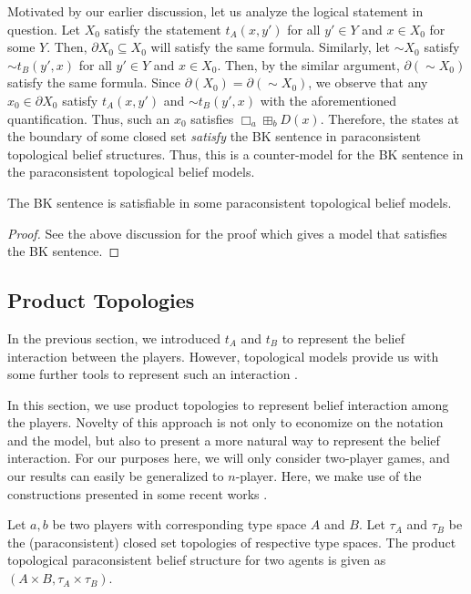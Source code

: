 \documentclass{article}
\begin{document}
Motivated by our earlier discussion, let us analyze the logical statement in question. Let $X_0$ satisfy the statement $t_A(x, y')$ for all $y' \in Y$ and $x \in X_0$ for some $Y$. Then, $\partial X_0 \subseteq X_0$ will satisfy the same formula. Similarly, let ${{\sim}} X_0$ satisfy ${{\sim}} t_B(y', x)$ for all $y' \in Y$ and $x \in X_0$. Then, by the similar argument, $\partial ({\sim} X_0)$ satisfy the same formula. Since $\partial(X_0) = \partial({\sim} X_0)$, we observe that any $x_0 \in \partial X_0$ satisfy $t_A(x, y')$ and ${{\sim}}t_B(y', x)$ with the aforementioned quantification. Thus, such an $x_0$ satisfies $\Box_a \boxplus_b D(x)$. Therefore, the states at the boundary of some closed set \emph{satisfy} the BK sentence in paraconsistent topological belief structures. Thus, this is a counter-model for the BK sentence in the paraconsistent topological belief models.

\begin{thm}The BK sentence is satisfiable in some paraconsistent topological belief models.\end{thm}

\begin{proof} See the above discussion for the proof which gives a model that satisfies the BK sentence. \end{proof}

\subsection{Product Topologies}

In the previous section, we introduced $t_A$ and $t_B$ to represent the belief interaction between the players. However, topological models provide us with some further tools to represent such an interaction \cite{gabb}.

In this section, we use product topologies to represent belief interaction among the players. Novelty of this approach is not only to economize on the notation and the model, but also to present a more natural way to represent the belief interaction. For our purposes here, we will only consider two-player games, and our results can easily be generalized to $n$-player. Here, we make use of the constructions presented in some recent works \cite{ben1,ben3}.

\begin{dfn}
Let $a, b$ be two players with corresponding type space $A$ and $B$. Let $\tau_A$ and $\tau_B$ be the (paraconsistent) closed set topologies of respective type spaces. The product topological paraconsistent belief structure for two agents is given as $(A \times B, \tau_A \times \tau_B)$.
\end{dfn}
 
\end{document}
